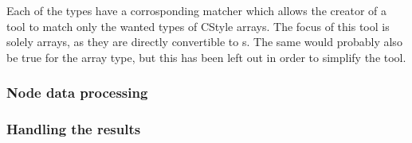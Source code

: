 Each of the types have a corrosponding matcher which allows the creator of a tool to match only the wanted types of CStyle arrays. The focus of this tool is solely  arrays, as they are directly convertible to s. The same would probably also be true for the  array type, but this has been left out in order to simplify the tool.




\subsubsection*{Node data processing}



\subsubsection*{Handling the results}

